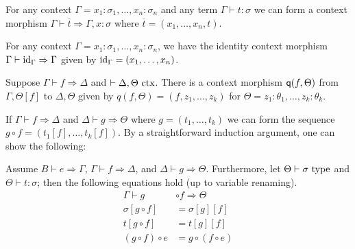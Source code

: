 \documentclass[a4paper]{article}
\begin{document}
\begin{example}\label{eg:bar}
  For any context $\Gamma = x_1 : \sigma_1,\ldots,x_n : \sigma_n$ and any term $\Gamma \vdash t : \sigma$ we can form a context morphism $\Gamma \vdash \overline{t} \Rightarrow \Gamma, x : \sigma$ where $\overline{t} = (x_1,\ldots,x_n,t)$.
\end{example}

\begin{example}
  For any context $\Gamma = x_1 : \sigma_1,\ldots,x_n : \sigma_n$, we have the identity context morphism $\Gamma \vdash \mathrm{id}_{\Gamma} \Rightarrow \Gamma$ given by $\mathrm{id}_{\Gamma} = (x_1,\ldots,x_n)$.
\end{example}

\begin{example}
  Suppose $\Gamma \vdash f \Rightarrow \Delta$ and $\vdash \Delta,\Theta~\mathrm{ctx}$.
  There is a context morphism $\operatorname{\mathsf{q}}(f,\Theta)$ from $\Gamma,\Theta[f]$ to $\Delta,\Theta$ given by $q(f,\Theta) = (f, z_1,\ldots,z_k)$ for $\Theta = z_1 : \theta_1,\ldots,z_k : \theta_k$.
\end{example}

If $\Gamma \vdash f \Rightarrow \Delta$ and $\Delta \vdash g \Rightarrow \Theta$ where $g = (t_1,\ldots,t_k)$ we can form the sequence $g \circ f = (t_1[f],\ldots,t_k[f])$.
By a straightforward induction argument, one can show the following:

\begin{proposition}
  Assume $B \vdash e \Rightarrow \Gamma$, $\Gamma \vdash f \Rightarrow \Delta$, and $\Delta \vdash g \Rightarrow \Theta$.
  Furthermore, let $\Theta \vdash \sigma~\mathrm{type}$ and $\Theta \vdash t : \sigma$; then the following equations hold (up to variable renaming).
  \begin{align*}
    \Gamma \vdash g &\circ f \Rightarrow \Theta\\
    \sigma[g \circ f] &= \sigma[g][f]\\
    t[g \circ f] &= t[g][f]\\
    (g \circ f) \circ e &= g \circ (f \circ e)
  \end{align*}
\end{proposition}
\end{document}

